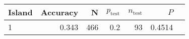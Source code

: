
\begin{tabular}{lrrrrrl}
\toprule
Island & Accuracy & N & $p_{\mbox{test}}$ & $n_{\mbox{test}}$ & $P$ & \\
\midrule
1 & 0.343 & 466 & 0.2 & 93 & 0.4514 & \\
\bottomrule
\end{tabular}
